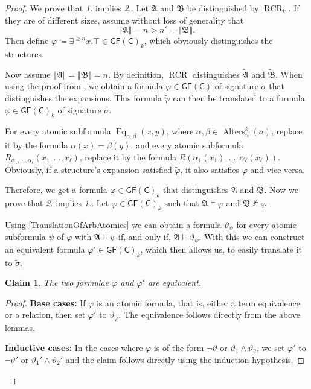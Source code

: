 \documentclass[a4paper,11pt,DIV=15]{scrartcl} %
\renewcommand{\phi}{\varphi}
\theoremstyle{plain}
\newtheorem{claim}[theorem]{Claim}
\theoremstyle{definition}
\newcommand{\GFC}{\mathsf{GF}(\mathsf{C})}
\newcommand{\RCR}{\operatorname{RCR}}
\renewcommand{\theta}{\vartheta}
\begin{document}
\begin{proof}
	We prove that \emph{1.} implies \emph{2.}. 
	Let $\mathfrak A$ and $\mathfrak B$ be distinguished by $\RCR_k$.
	If they are of different sizes, assume without loss of generality that 
	$$\Vert \mathfrak A \Vert =n > n'=\Vert \mathfrak B \Vert.$$
	Then define $\phi\coloneqq \exists^{\geq n} x. \top\in \GFC_k$, which obviously distinguishes the structures.
	
	Now assume $\Vert \mathfrak A\Vert = \Vert \mathfrak B \Vert = n$.
	By definition, $\RCR$ distinguishes $\widetilde{\mathfrak A}$ and $\widetilde{\mathfrak B}$.
	When using the proof from \cite{scheidt2025ColorRefinement}, we obtain a formula $\widetilde{\phi}\in \GFC$ of signature $\widetilde{\sigma}$ that distinguishes the expansions.
	This formula $\widetilde{\phi}$ can then be translated to a formula $\phi\in\GFC_k$ of signature $\sigma$.
	
	For every atomic subformula $\operatorname{Eq}_{\alpha,\beta}(x,y)$, where $\alpha,\beta\in \operatorname{Alters}_n^k(\sigma)$, replace it by the formula $\alpha(x)=\beta(y)$,
	and every atomic subformula $R_{\alpha_1,\dots,\alpha_\ell}(x_1,\dots,x_\ell)$, replace it by the formula $R(\alpha_1(x_1),\dots,\alpha_\ell(x_\ell))$.
	Obviously, if a structure's expansion satisfied $\widetilde{\phi}$, it also satisfies $\phi$ and vice versa.
	
	Therefore, we get a formula $\phi\in \GFC_k$ that distinguishes $\mathfrak A$ and $\mathfrak B$.
	\break
	Now we prove that \emph{2.} implies \emph{1.}.
	Let $\phi\in \GFC_k$ such that $\mathfrak A\models \phi$ and $\mathfrak B\not\models \phi$.
	
	Using \cref{TranslationOfArbAtomics} we can obtain a formula $\theta_\psi$ for every atomic subformula $\psi$ of $\phi$ with $\mathfrak A\models \psi$ if, and only if, $\mathfrak A\models \theta_\psi$.
	With this we can construct an equivalent formula $\phi'\in\GFC_k$, which then allows us, to easily translate it to $\widetilde{\sigma}$.
	
	\begin{claim}
		The two formulae $\phi$ and $\phi'$ are equivalent.
	\end{claim}
	\begin{proof}
		\textbf{Base cases:}
		If $\phi$ is an atomic formula, that is, either a term equivalence or a relation, then set $\phi'$ to $\theta_\phi$.
		The equivalence follows directly from the above lemmas.
		
		\textbf{Inductive cases:}
		In the cases where $\phi$ is of the form $\neg\theta$ or $\theta_1\land\theta_2$, we set $\phi'$ to $\neg\theta'$ or $\theta_1'\land\theta_2'$ and the claim follows directly using the induction hypothesis.
		

\end{proof}
\end{proof}
\end{document}

